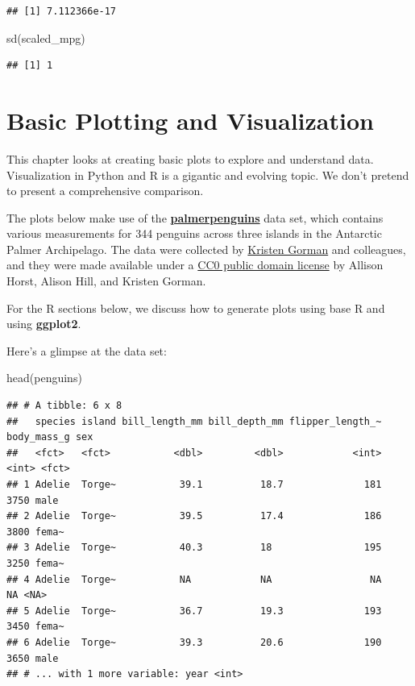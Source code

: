 \documentclass[
]{book}
\newenvironment{Shaded}{\begin{snugshade}}{\end{snugshade}}
\newcommand{\FunctionTok}[1]{\textcolor[rgb]{0.00,0.00,0.00}{#1}}
\newcommand{\NormalTok}[1]{#1}
\begin{document}
\begin{verbatim}
## [1] 7.112366e-17
\end{verbatim}

\begin{Shaded}
\begin{Highlighting}[]
\FunctionTok{sd}\NormalTok{(scaled\_mpg)}
\end{Highlighting}
\end{Shaded}

\begin{verbatim}
## [1] 1
\end{verbatim}

\hypertarget{basic-plotting-and-visualization}{%
\chapter{Basic Plotting and Visualization}\label{basic-plotting-and-visualization}}

This chapter looks at creating basic plots to explore and understand data. Visualization in Python and R is a gigantic and evolving topic. We don't pretend to present a comprehensive comparison.

The plots below make use of the \href{https://allisonhorst.github.io/palmerpenguins/}{\textbf{palmerpenguins}} data set, which contains various measurements for 344 penguins across three islands in the Antarctic Palmer Archipelago. The data were collected by \href{https://www.uaf.edu/cfos/people/faculty/detail/kristen-gorman.php}{Kristen Gorman} and colleagues, and they were made available under a \href{https://creativecommons.org/share-your-work/public-domain/cc0/}{CC0 public domain license} by Allison Horst, Alison Hill, and Kristen Gorman.

For the R sections below, we discuss how to generate plots using base R and using \textbf{ggplot2}.

Here's a glimpse at the data set:

\begin{Shaded}
\begin{Highlighting}[]
\FunctionTok{head}\NormalTok{(penguins)}
\end{Highlighting}
\end{Shaded}

\begin{verbatim}
## # A tibble: 6 x 8
##   species island bill_length_mm bill_depth_mm flipper_length_~ body_mass_g sex  
##   <fct>   <fct>           <dbl>         <dbl>            <int>       <int> <fct>
## 1 Adelie  Torge~           39.1          18.7              181        3750 male 
## 2 Adelie  Torge~           39.5          17.4              186        3800 fema~
## 3 Adelie  Torge~           40.3          18                195        3250 fema~
## 4 Adelie  Torge~           NA            NA                 NA          NA <NA> 
## 5 Adelie  Torge~           36.7          19.3              193        3450 fema~
## 6 Adelie  Torge~           39.3          20.6              190        3650 male 
## # ... with 1 more variable: year <int>
\end{verbatim}
\end{document}
